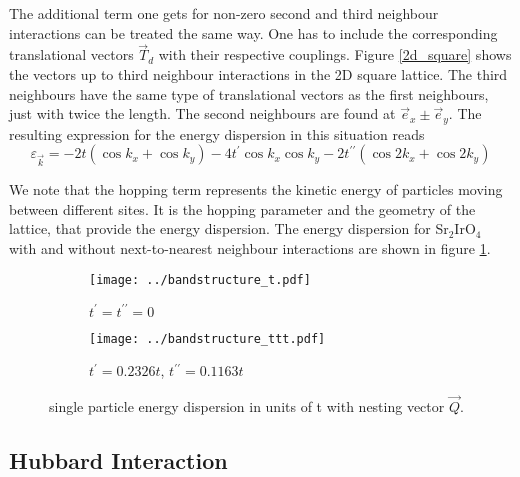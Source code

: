\documentclass[a4paper,12pt]{report}
\begin{document}
The additional term one gets for non-zero second and third neighbour interactions can be treated the same way. 
One has to include the corresponding translational vectors $\vec T_d$ with their respective couplings.
Figure \ref{2d_square} shows the vectors up to third neighbour interactions in the 2D square lattice.
The third neighbours have the same type of translational vectors as the first neighbours, just with twice the length.
The second neighbours are found at $\vec e_x \pm \vec e_y$.
The resulting expression for the energy dispersion in this situation reads
\begin{equation}
 \varepsilon_{\vec k } = -2t \left(\cos k_x + \cos k_y \right) -4t^{\prime} \cos k_x \cos k_y  -2t^{\prime \prime} \left( \cos 2k_x + \cos 2k_y \right)
\end{equation}

We note that the hopping term represents the kinetic energy of particles moving between different sites. 
It is the hopping parameter and the 
geometry of the lattice, that provide the energy dispersion. 
The energy dispersion for Sr$_2$IrO$_4$  with and without next-to-nearest neighbour interactions are shown in figure \ref{fig:energie_dispersion}.



\begin{figure} \centering
\begin{subfigure}{0.49\linewidth} \centering
 \texttt{[image: ../bandstructure\_t.pdf]}
 \caption{$ t^{\prime}=t^{\prime \prime} =0$ }
\end{subfigure}
\begin{subfigure}{0.49\linewidth}
  \texttt{[image: ../bandstructure\_ttt.pdf]}
  \caption{ $t^{\prime}= 0.2326t$, $t^{\prime \prime} = 0.1163t$}
\end{subfigure}
\caption{single particle energy dispersion in units of t with nesting vector $\vec Q$. }
\label{fig:energie_dispersion}
\end{figure}




\subsection{Hubbard Interaction}
\end{document}
